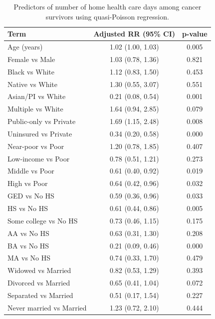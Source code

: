 
\begin{longtable}[t]{lcc}
\caption{\label{tab:tab:intensity-cancer}Predictors of number of home health care days among cancer survivors using quasi-Poisson regression.}\\
\toprule
Term & Adjusted RR (95\% CI) & p-value\\
\midrule
Age (years) & 1.02 (1.00, 1.03) & 0.005\\
Female vs Male & 1.03 (0.78, 1.36) & 0.821\\
Black vs White & 1.12 (0.83, 1.50) & 0.453\\
Native vs White & 1.30 (0.55, 3.07) & 0.551\\
Asian/PI vs White & 0.21 (0.08, 0.54) & 0.001\\
\addlinespace
Multiple vs White & 1.64 (0.94, 2.85) & 0.079\\
Public-only vs Private & 1.69 (1.15, 2.48) & 0.008\\
Uninsured vs Private & 0.34 (0.20, 0.58) & 0.000\\
Near-poor vs Poor & 1.20 (0.78, 1.85) & 0.407\\
Low-income vs Poor & 0.78 (0.51, 1.21) & 0.273\\
\addlinespace
Middle vs Poor & 0.61 (0.40, 0.92) & 0.019\\
High vs Poor & 0.64 (0.42, 0.96) & 0.032\\
GED vs No HS & 0.59 (0.36, 0.96) & 0.033\\
HS vs No HS & 0.61 (0.44, 0.86) & 0.005\\
Some college vs No HS & 0.73 (0.46, 1.15) & 0.175\\
\addlinespace
AA vs No HS & 0.63 (0.31, 1.30) & 0.208\\
BA vs No HS & 0.21 (0.09, 0.46) & 0.000\\
MA vs No HS & 0.74 (0.33, 1.70) & 0.479\\
Widowed vs Married & 0.82 (0.53, 1.29) & 0.393\\
Divorced vs Married & 0.65 (0.41, 1.04) & 0.072\\
\addlinespace
Separated vs Married & 0.51 (0.17, 1.54) & 0.227\\
Never married vs Married & 1.23 (0.72, 2.10) & 0.444\\
\bottomrule
\end{longtable}
